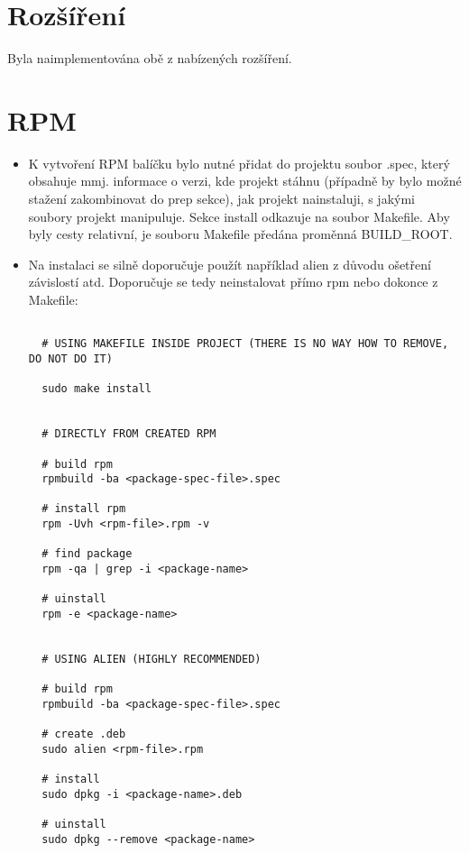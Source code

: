 \documentclass[a4paper,11pt]{article}
\begin{document}
\section*{Rozšíření}

Byla naimplementována obě z nabízených rozšíření.

\section*{RPM}
\begin{itemize}
  \item K vytvoření RPM balíčku bylo nutné přidat do projektu soubor .spec, který obsahuje mmj. informace o verzi, kde projekt stáhnu (případně by bylo možné stažení zakombinovat do prep sekce),
  jak projekt nainstaluji, s jakými soubory projekt manipuluje. Sekce install odkazuje na soubor Makefile. Aby byly cesty relativní, je souboru Makefile předána proměnná BUILD\_ROOT.

  \item Na instalaci se silně doporučuje použít například alien z důvodu ošetření závislostí atd. Doporučuje se tedy neinstalovat přímo rpm nebo dokonce z Makefile:

  \lstset{language=Bash}
  \begin{lstlisting}[frame=single,breaklines]

  # USING MAKEFILE INSIDE PROJECT (THERE IS NO WAY HOW TO REMOVE, DO NOT DO IT)

  sudo make install


  # DIRECTLY FROM CREATED RPM

  # build rpm
  rpmbuild -ba <package-spec-file>.spec

  # install rpm
  rpm -Uvh <rpm-file>.rpm -v

  # find package
  rpm -qa | grep -i <package-name>

  # uinstall
  rpm -e <package-name>


  # USING ALIEN (HIGHLY RECOMMENDED)

  # build rpm
  rpmbuild -ba <package-spec-file>.spec

  # create .deb
  sudo alien <rpm-file>.rpm

  # install
  sudo dpkg -i <package-name>.deb

  # uinstall
  sudo dpkg --remove <package-name>

\end{lstlisting}
\end{itemize}
\end{document}
